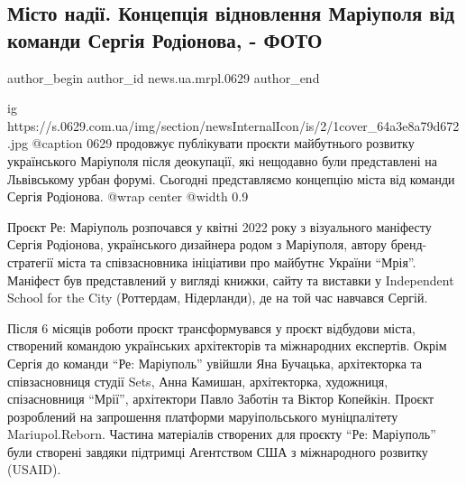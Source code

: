  
 
 
 
 
 
\subsection{Місто надії. Концепція відновлення Маріуполя від команди Сергія Родіонова, - ФОТО}
\label{sec:04_07_2023.stz.news.ua.mrpl.0629.1.misto_nadii_proekt_sergij_rodionov}
 
\ifcmt
 author_begin
   author_id news.ua.mrpl.0629
 author_end
\fi


\ifcmt
  ig https://s.0629.com.ua/img/section/newsInternalIcon/is/2/1cover_64a3e8a79d672.jpg
  @caption 0629 продовжує публікувати проєкти майбутнього розвитку українського Маріуполя після деокупації, які нещодавно були представлені на Львівському урбан форумі. Сьогодні представляємо концепцію міста від команди Сергія Родіонова.
  @wrap center
  @width 0.9
\fi

Проєкт Ре: Маріуполь розпочався у квітні 2022 року з візуального маніфесту
Сергія Родіонова, українського дизайнера родом з Маріуполя, автору
бренд-стратегії міста та співзасновника ініціативи про майбутнє України \enquote{Мрія}.
Маніфест був представлений у вигляді книжки, сайту та виставки у Independent
School for the City (Роттердам, Нідерланди), де на той час навчався Сергій. 

Після 6 місяців роботи проєкт трансформувався у проєкт відбудови міста,
створений командою українських архітекторів та міжнародних експертів. Окрім
Сергія до команди \enquote{Ре: Маріуполь} увійшли Яна Бучацька, архітекторка та
співзасновниця студії Sets, Анна Камишан, архітекторка, художниця,
спізасновниця \enquote{Мрії}, архітектори Павло Заботін та Віктор Копейкін. Проєкт
розроблений на запрошення платформи маруіпольського муніцпалітету
Mariupol.Reborn. Частина матеріалів створених для проєкту \enquote{Ре: Маріуполь} були
створені завдяки підтримці Агентством США з міжнародного розвитку (USAID).

